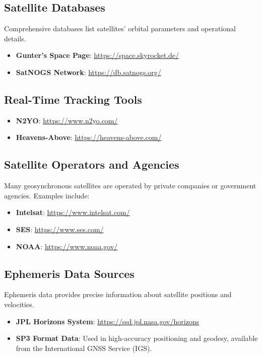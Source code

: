 \subsection{Satellite Databases}
Comprehensive databases list satellites' orbital parameters and operational details.

\begin{itemize}
    \item \textbf{Gunter's Space Page}: \url{https://space.skyrocket.de/}
    \item \textbf{SatNOGS Network}: \url{https://db.satnogs.org/}
\end{itemize}

\subsection{Real-Time Tracking Tools}
\begin{itemize}
    \item \textbf{N2YO}: \url{https://www.n2yo.com/}
    \item \textbf{Heavens-Above}: \url{https://heavens-above.com/}
\end{itemize}

\subsection{Satellite Operators and Agencies}
Many geosynchronous satellites are operated by private companies or government agencies. Examples include:
\begin{itemize}
    \item \textbf{Intelsat}: \url{https://www.intelsat.com/}
    \item \textbf{SES}: \url{https://www.ses.com/}
    \item \textbf{NOAA}: \url{https://www.noaa.gov/}
\end{itemize}

\subsection{Ephemeris Data Sources}
Ephemeris data provides precise information about satellite positions and velocities.
\begin{itemize}
    \item \textbf{JPL Horizons System}: \url{https://ssd.jpl.nasa.gov/horizons}
    \item \textbf{SP3 Format Data}: Used in high-accuracy positioning and geodesy, available from the International GNSS Service (IGS).
\end{itemize}

